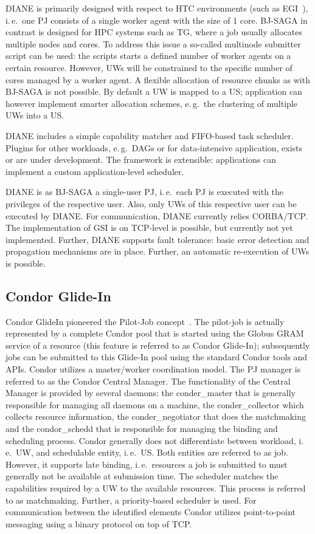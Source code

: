 \documentclass[conference,final]{IEEEtran}
\newcommand{\upp}{\vspace*{-0.5em}}
\begin{document}
DIANE is primarily designed with respect to HTC environments (such as
EGI~\cite{egi}), i.\,e.\ one PJ consists of a single worker agent with the size
of 1 core. BJ-SAGA in contrast is designed for HPC systems such as TG, where a
job usually allocates multiple nodes and cores. To address this issue a
so-called multinode submitter script can be used: the scripts starts a defined
number of worker agents on a certain resource. However, UWs will be constrained
to the specific number of cores managed by a worker agent. A flexible allocation
of resource chunks as with BJ-SAGA is not possible. By default a UW is mapped to
a US; application can however implement smarter allocation schemes, e.\,g.\ the
clustering of multiple UWs into a US.

DIANE includes a simple capability matcher and FIFO-based task scheduler.
Plugins for other workloads, e.\,g.\ DAGs or for data-intensive
application, exists or are under development. The framework is extensible:
applications can implement a custom application-level scheduler.


DIANE is as BJ-SAGA a single-user PJ, i.\,e.\ each PJ is executed with the
privileges of the respective user. Also, only UWs of this respective user can be
executed by DIANE. For communication, DIANE currently relies CORBA/TCP. The 
implementation of GSI is on TCP-level is possible, but currently not yet 
implemented. Further, DIANE supports fault tolerance: basic error detection and propagation mechanisms are in place. Further, an automatic re-execution of UWs is possible.


\subsection{Condor Glide-In\upp\upp}

Condor GlideIn pioneered the Pilot-Job concept~\cite{condor-g}. The pilot-job is
actually represented by a complete Condor pool that is started using the Globus
GRAM service of a resource (this feature is referred to as Condor Glide-In);
subsequently jobs can be submitted to this Glide-In pool using the standard
Condor tools and APIs. Condor utilizes a master/worker coordination model. The
PJ manager is referred to as the Condor Central Manager. The functionality of
the Central Manager is provided by several daemons: the conder\_master that is
generally responsible for managing all daemons on a machine, the
conder\_collector which collects resource information, the conder\_negotiator
that does the matchmaking and the condor\_schedd that is responsible for
managing the binding and scheduling process. Condor generally does not
differentiate between workload, i.\,e.\ UW, and schedulable entity, i.\,e.\ US.
Both entities are referred to as job. However, it supports late binding,
i.\,e.\ resources a job is submitted to must generally not be available at
submission time. The scheduler matches the capabilities required by a UW to the
available resources. This process is referred to as matchmaking. Further, a
priority-based scheduler is used. For communication between the identified
elements Condor utilizes point-to-point messaging using a binary protocol on top
of TCP.
\end{document}
